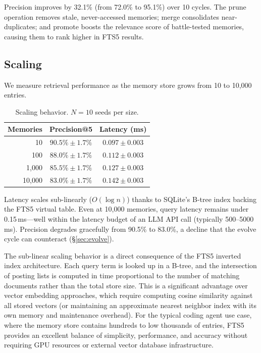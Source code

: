 \documentclass{article}
\begin{document}
Precision improves by 32.1\% (from 72.0\% to 95.1\%) over 10 cycles. The prune operation removes stale, never-accessed memories; merge consolidates near-duplicates; and promote boosts the relevance score of battle-tested memories, causing them to rank higher in FTS5 results.

\subsection{Scaling}
\label{sec:scaling}

We measure retrieval performance as the memory store grows from 10 to 10{,}000 entries.

\begin{table}[h]
\centering
\caption{Scaling behavior. $N = 10$ seeds per size.}
\label{tab:scaling}
\begin{tabular}{rcc}
\toprule
\textbf{Memories} & \textbf{Precision@5} & \textbf{Latency (ms)} \\
\midrule
10 & $90.5\% \pm 1.7\%$ & $0.097 \pm 0.003$ \\
100 & $88.0\% \pm 1.7\%$ & $0.112 \pm 0.003$ \\
1{,}000 & $85.5\% \pm 1.7\%$ & $0.127 \pm 0.003$ \\
10{,}000 & $83.0\% \pm 1.7\%$ & $0.142 \pm 0.003$ \\
\bottomrule
\end{tabular}
\end{table}

Latency scales sub-linearly ($O(\log n)$) thanks to SQLite's B-tree index backing the FTS5 virtual table. Even at 10{,}000 memories, query latency remains under 0.15\,ms---well within the latency budget of an LLM API call (typically 500--5000\,ms). Precision degrades gracefully from 90.5\% to 83.0\%, a decline that the evolve cycle can counteract (\S\ref{sec:evolve}).

The sub-linear scaling behavior is a direct consequence of the FTS5 inverted index architecture. Each query term is looked up in a B-tree, and the intersection of posting lists is computed in time proportional to the number of matching documents rather than the total store size. This is a significant advantage over vector embedding approaches, which require computing cosine similarity against all stored vectors (or maintaining an approximate nearest neighbor index with its own memory and maintenance overhead). For the typical coding agent use case, where the memory store contains hundreds to low thousands of entries, FTS5 provides an excellent balance of simplicity, performance, and accuracy without requiring GPU resources or external vector database infrastructure.
\end{document}
